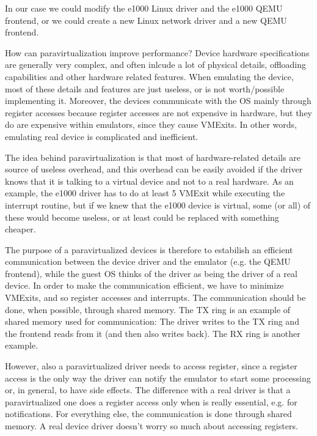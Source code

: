 In our case we could modify the e1000 Linux driver and the e1000 QEMU frontend, or we could create a new Linux network driver and
a new QEMU frontend.

\vspace{0.5cm}

How can paravirtualization improve performance? Device hardware specifications are generally very complex, and often
inlcude a lot of physical details, offloading capabilities and other hardware related features. When emulating the device, most of these 
details and features are just useless, or is not worth/possible implementing it. Moreover, the devices communicate with the OS mainly 
through register accesses because register accesses are not expensive in hardware, but they do are expensive within emulators, since
they cause VMExits. In other words, emulating real device is complicated and inefficient.

\vspace{0.5cm}

The idea behind paravirtualization is that most of hardware-related details are source of useless overhead, and this overhead can be 
easily avoided if the driver knows that it is talking to a virtual device and not to a real hardware. As an example, the e1000 driver has
to do at least 5 VMExit while executing the interrupt routine, but if we knew that the e1000 device is virtual, some (or all) of these
would become useless, or at least could be replaced with something cheaper.

The purpose of a paravirtualized devices is therefore to estabilish an efficient communication between the device driver and the emulator
(e.g. the QEMU frontend), while the guest OS thinks of the driver as being the driver of a real device.
In order to make the communication efficient, we have to minimize VMExits, and so register accesses and interrupts. The communication
should be done, when
possible, through shared memory. The TX ring is an example of shared memory used for communication: The driver writes to the TX ring and
the frontend reads from it (and then also writes back). The RX ring is another example.

\vspace{0.5cm}

However, also a paravirtualized driver needs to access register, since a register access is the only way the driver can notify the
emulator to start some processing or, in general, to have side effects. The difference with a real driver is that a paravirtualized one
does a register access only when is really essential, e.g. for notifications. For everything else, the communication is done through
shared memory. A real device driver doesn't worry so much about accessing registers.

